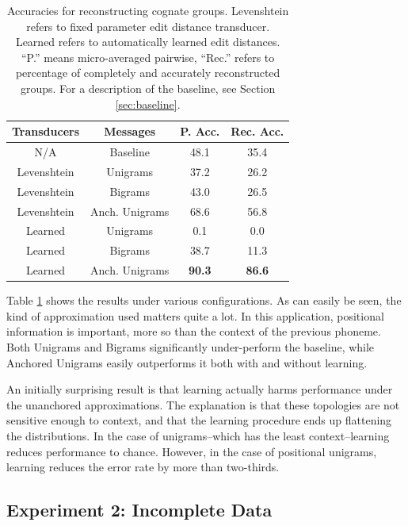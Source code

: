 \documentclass[11pt,a4paper]{article}
\begin{document}
\begin{table}
  \small
  { 
  \begin{tabular}{|c|c|c|c|}
    \hline
    Transducers & Messages & P. Acc. & Rec. Acc. \\
    \hline
    N/A & Baseline & 48.1 & 35.4  \\
    \hline
    Levenshtein&Unigrams & 37.2 & 26.2 \\
    Levenshtein&Bigrams & 43.0 & 26.5 \\
    Levenshtein&Anch. Unigrams & 68.6 & 56.8\\
    \hline 
    Learned&Unigrams & 0.1 & 0.0 \\
    Learned&Bigrams & 38.7 & 11.3 \\
    Learned&Anch. Unigrams & \textbf{90.3}  & \textbf{86.6} \\
    \hline
  \end{tabular}
  \caption{Accuracies for reconstructing cognate groups. Levenshtein
  refers to fixed parameter edit distance transducer. Learned refers
  to automatically learned edit distances. ``P.'' means micro-averaged
  pairwise, ``Rec.'' refers to percentage of completely and accurately
  reconstructed groups. For a description of the baseline, see Section \ref{sec:baseline}. }
  \label{tbl:exp1}
 }
\end{table}

Table \ref{tbl:exp1} shows the results under various configurations.
As can easily be seen, the kind of approximation used matters quite
a lot. In this application, positional information is important,
more so than the context of the previous phoneme. Both Unigrams and
Bigrams significantly under-perform the baseline, while Anchored
Unigrams easily outperforms it both with and without learning.

An initially surprising result is that learning actually harms
performance under the unanchored approximations. The explanation
is that these topologies are not sensitive enough to context, and
that the learning procedure ends up flattening the distributions.
In the case of unigrams--which has the least context--learning
reduces performance to chance. However, in the case of positional
unigrams, learning reduces the error rate by more than two-thirds.

\subsection{Experiment 2: Incomplete Data}
\end{document}
